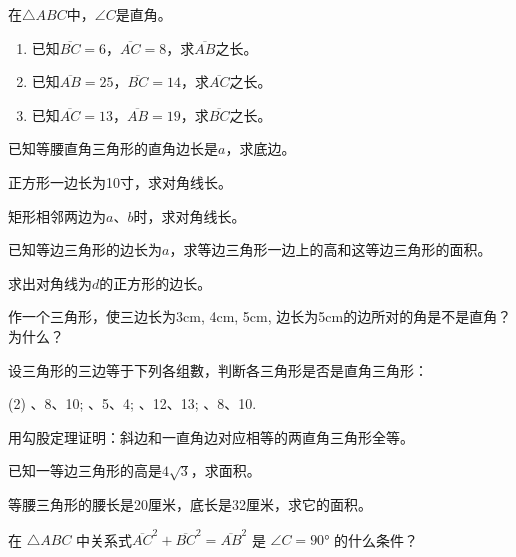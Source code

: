 \begin{Practice}
\begin{question}
  \item 在$\triangle ABC$中，$\angle C$是直角。
  \begin{enumerate}
      \item 已知$\overline{BC}=6$，$\overline{AC}=8$，求$\overline{AB}$之长。
      \item 已知$\overline{AB}=25$，$\overline{BC}=14$，求$\overline{AC}$之长。
      \item 已知$\overline{AC}=13$，$\overline{AB}=19$，求$\overline{BC}$之长。
  \end{enumerate}
  \item 已知等腰直角三角形的直角边长是$a$，求底边。
  \item 正方形一边长为10寸，求对角线长。
  \item 矩形相邻两边为$a$、$b$时，求对角线长。
  \item 已知等边三角形的边长为$a$，求等边三角形一边上的高和这等边三角形的面积。
  \item 求出对角线为$d$的正方形的边长。
  \item 作一个三角形，使三边长为3cm, 4cm, 5cm, 边长为5cm的边所对的角是不是直角？为什么？
  \item 设三角形的三边等于下列各组數，判断各三角形是否是直角三角形：
  \begin{tasks}(2)
      、8、10;
      、5、4;
      、12、13;
      、8、10.
  \end{tasks}
  \item 用勾股定理证明：斜边和一直角边对应相等的两直角三角形全等。
  \item 已知一等边三角形的高是$4\sqrt{3}$，求面积。
  \item 等腰三角形的腰长是20厘米，底长是32厘米，求它的面积。
  \item 在 $\triangle ABC$ 中关系式$\overline{AC}^2+\overline{BC}^2=\overline{AB}^2$ 是 $\angle C=\ang{90}$ 的什么条件？
\end{question}
\end{Practice}

